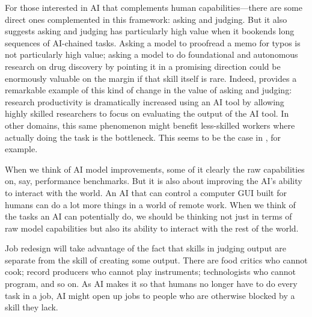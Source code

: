 \documentclass{article}
\begin{document}
For those interested in AI that complements human capabilities---there are some direct ones complemented in this framework: asking and judging.
But it also suggests asking and judging has particularly high value when it bookends long sequences of AI-chained tasks.
Asking a model to proofread a memo for typos is not particularly high value;
asking a model to do foundational and autonomous research on drug discovery by pointing it in a promising direction could be enormously valuable on the margin if that skill itself is rare.
Indeed, \cite{toner2024artificial} provides a remarkable example of this kind of change in the value of asking and judging:
research productivity is dramatically increased using an AI tool by allowing highly skilled researchers to focus on evaluating the output of the AI tool.
In other domains, this same phenomenon might benefit less-skilled workers where actually doing the task is the bottleneck.
This seems to be the case in \cite{brynjolfsson2023generative}, for example.
  
When we think of AI model improvements, some of it clearly the raw capabilities on, say, performance benchmarks. 
But it is also about improving the AI's ability to interact with the world. 
An AI that can control a computer GUI built for humans can do a lot more things in a world of remote work.
When we think of the tasks an AI can potentially do, we should be thinking not just in terms of raw model capabilities but also its ability to interact with the rest of the world.

Job redesign will take advantage of the fact that skills in judging output are separate from the skill of creating some output.
There are food critics who cannot cook; record producers who cannot play instruments; technologists who cannot program, and so on.
As AI makes it so that humans no longer have to do every task in a job, AI might open up jobs to people who are otherwise blocked by a skill they lack.



\end{document}

